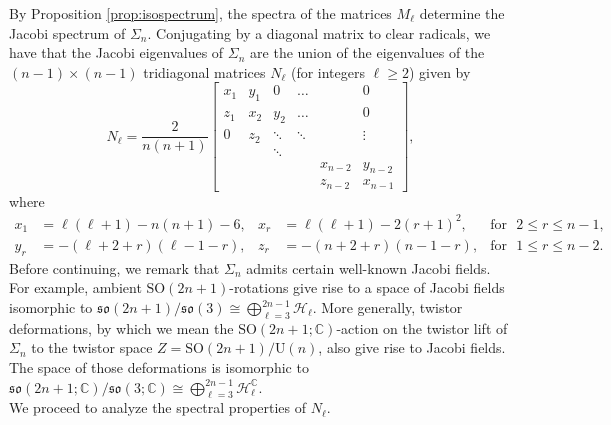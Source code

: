 \documentclass[11pt]{article}
\newcommand{\SO}{\mathrm{SO}}
\newcommand{\U}{\mathrm{U}}
\newcommand{\C}{\mathbb{C}}
\theoremstyle{definition}
\numberwithin{equation}{section}
\begin{document}
\indent \indent By Proposition \ref{prop:isospectrum}, the spectra of the matrices $M_\ell$ determine the Jacobi spectrum of $\Sigma_n$.  Conjugating by a diagonal matrix to clear radicals, we have that the Jacobi eigenvalues of $\Sigma_n$ are the union of the eigenvalues of the $(n-1) \times (n-1)$ tridiagonal matrices $N_{\ell}$ (for integers $\ell \geq 2$) given by
\begin{equation*}
    N_\ell = \frac{2}{n(n+1)} \begin{bmatrix}
    x_1 & y_{1} & 0   & \dots  &   & 0   \\
    z_1  & x_2       & y_2   & \dots  &   & 0   \\
    0  &     z_2    & \ddots         & \ddots  &  & \vdots    \\
    & & \ddots & & & \\
      &         &      &     &     x_{n-2}      & y_{n-2}   \\
      &         &      &     &     z_{n-2}      & x_{n-1}
  \end{bmatrix},
\end{equation*}
where
\begin{equation}\label{eq:xyzformulas}
    \begin{aligned}
        x_1 &= \ell(\ell+1) - n(n+1) - 6, & x_r &= \ell(\ell+1) - 2(r+1)^2, & \text{for} \:\:\: 2 \leq r \leq n-1, \\
        y_r &= -(\ell+2+r)(\ell - 1 - r), & z_r &= -(n+2+r)(n-1-r), & \text{for} \:\:\: 1 \leq r \leq n-2.
    \end{aligned}
\end{equation}
\indent Before continuing, we remark that $\Sigma_n$ admits certain well-known Jacobi fields.  For example, ambient $\SO(2n+1)$-rotations give rise to a space of Jacobi fields isomorphic to $\mathfrak{so}(2n+1)/\mathfrak{so}(3) \cong \bigoplus_{\ell=3}^{2n-1} \mathcal{H}_\ell$.  More generally, twistor deformations, by which we mean the $\SO(2n+1; \C)$-action on the twistor lift of $\Sigma_n$ to the twistor space $Z = \SO(2n+1)/\U(n)$, also give rise to Jacobi fields.  The space of those deformations is isomorphic to $\mathfrak{so}(2n+1; \C)/\mathfrak{so}(3;\C) \cong \bigoplus_{\ell=3}^{2n-1} \mathcal{H}_\ell^\C$. \\
\indent We proceed to analyze the spectral properties of $N_\ell$.
\end{document}
